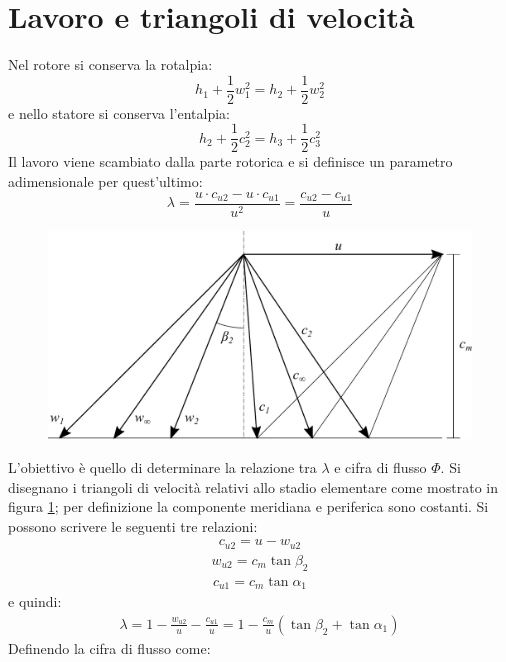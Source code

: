 \section{Lavoro e triangoli di velocità}
Nel rotore si conserva la rotalpia:
\begin{equation}
h_1 + \frac{1}{2} w_1^2 = h_2 + \frac{1}{2} w_2^2
\end{equation}
e nello statore si conserva l'entalpia:
\begin{equation}
h_2 + \frac{1}{2} c_2^2 = h_3 + \frac{1}{2} c_3^2
\end{equation}
Il lavoro viene scambiato dalla parte rotorica e si definisce un parametro adimensionale per quest'ultimo:
\begin{equation}
\lambda = \frac{u \cdot c_{u2} - u \cdot c_{u1}}{u^2} = \frac{c_{u2} - c_{u1}}{u}
\end{equation}
\begin{figure}
\centering
  \includegraphics[width=.8\textwidth]{fig/triangComp.pdf}
\caption{}
\label{fig:triangComp}
\end{figure}
L'obiettivo è quello di determinare la relazione tra $\lambda$ e cifra di flusso $\Phi$. Si disegnano i triangoli di velocità relativi allo stadio elementare come mostrato in figura \ref{fig:triangComp}; per definizione la componente meridiana e periferica sono costanti. Si possono scrivere le seguenti tre relazioni:
\begin{align*}
c_{u2} = u - w_{u2}
\end{align*}
\begin{align*}
w_{u2} = c_m \tan \beta_2
\end{align*}
\begin{align*}
c_{u1} = c_m \tan \alpha_1
\end{align*}
e quindi:
\begin{align*}
\lambda = 1- \frac{w_{u2}}{u} - \frac{c_{u1}}{u} = 1 - \frac{c_m}{u} \left(\tan \beta_2 + \tan \alpha_1 \right)
\end{align*}
Definendo  la cifra di flusso come:

